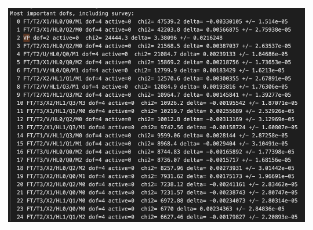 \documentclass[aspectratio=1610, 12pt]{beamer}
\begin{document}
\begin{frame}
  \begin{figure}
    \includegraphics[width=0.7\textwidth]{plots/03-19/dof4.png}
  \end{figure}
\end{frame}
\end{document}
